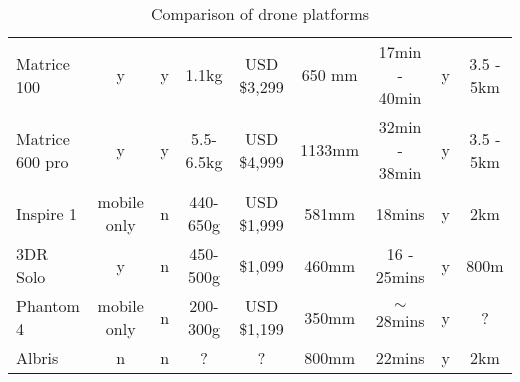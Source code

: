 \documentclass[capstone_report.tex]{subfiles}
\begin{document}
{\begin{sidewaystable}
\begin{tabular}{@{}lcccccccc@{}}
Matrice 100            & y           & y   & 1.1kg              & USD \$3,299  & 650 mm & 17min - 40min & y           & 3.5 - 5km             \\
Matrice 600 pro        & y           & y   & 5.5-6.5kg          & USD \$4,999  & 1133mm & 32min - 38min & y           & 3.5 - 5km             \\
Inspire 1              & mobile only & n   & 440-650g           & USD \$1,999  & 581mm  & 18mins        & y           & 2km                   \\
3DR Solo               & y           & n   & 450-500g           & \$1,099      & 460mm  & 16 - 25mins   & y           & 800m                  \\
Phantom 4              & mobile only & n   & 200-300g           & USD \$1,199  & 350mm  & $\sim$28mins  & y           & ?                     \\
Albris                 & n           & n   & ?                  & ?            & 800mm  & 22mins        & y           & 2km                   \\ \bottomrule
\end{tabular}
\caption{Comparison of drone platforms}
\label{comparison}
\end{sidewaystable}\clearpage}
\end{document}

